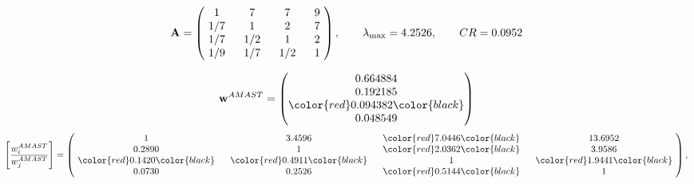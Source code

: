 \begin{example}
\begin{equation*}
\mathbf{A} =
\begin{pmatrix}
$\,\,$ 1 $\,\,$ & $\,\,$7$\,\,$ & $\,\,$7$\,\,$ & $\,\,$9 $\,\,$ \\
$\,\,$ 1/7$\,\,$ & $\,\,$ 1 $\,\,$ & $\,\,$2$\,\,$ & $\,\,$7 $\,\,$ \\
$\,\,$ 1/7$\,\,$ & $\,\,$ 1/2$\,\,$ & $\,\,$ 1 $\,\,$ & $\,\,$2 $\,\,$ \\
$\,\,$ 1/9$\,\,$ & $\,\,$ 1/7$\,\,$ & $\,\,$ 1/2$\,\,$ & $\,\,$ 1  $\,\,$ \\
\end{pmatrix},
\qquad
\lambda_{\max} =
4.2526,
\qquad
CR = 0.0952
\end{equation*}

\begin{equation*}
\mathbf{w}^{AMAST} =
\begin{pmatrix}
0.664884\\
0.192185\\
\color{red} 0.094382\color{black} \\
0.048549
\end{pmatrix}\end{equation*}
\begin{equation*}
\left[ \frac{{w}^{AMAST}_i}{{w}^{AMAST}_j} \right] =
\begin{pmatrix}
$\,\,$ 1 $\,\,$ & $\,\,$3.4596$\,\,$ & $\,\,$\color{red} 7.0446\color{black} $\,\,$ & $\,\,$13.6952$\,\,$ \\
$\,\,$0.2890$\,\,$ & $\,\,$ 1 $\,\,$ & $\,\,$\color{red} 2.0362\color{black} $\,\,$ & $\,\,$3.9586  $\,\,$ \\
$\,\,$\color{red} 0.1420\color{black} $\,\,$ & $\,\,$\color{red} 0.4911\color{black} $\,\,$ & $\,\,$ 1 $\,\,$ & $\,\,$\color{red} 1.9441\color{black}  $\,\,$ \\
$\,\,$0.0730$\,\,$ & $\,\,$0.2526$\,\,$ & $\,\,$\color{red} 0.5144\color{black} $\,\,$ & $\,\,$ 1  $\,\,$ \\
\end{pmatrix},
\end{equation*}


\end{example}
